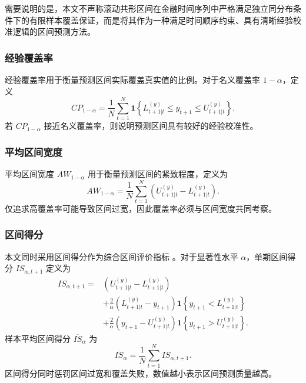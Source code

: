需要说明的是，本文不声称滚动共形区间在金融时间序列中严格满足独立同分布条件下的有限样本覆盖保证，而是将其作为一种满足时间顺序约束、具有清晰经验校准逻辑的区间预测方法。

\subsubsection{经验覆盖率}

经验覆盖率用于衡量预测区间实际覆盖真实值的比例。对于名义覆盖率 \(1-\alpha\)，定义
\begin{equation}
	CP_{1-\alpha}
	=
	\frac{1}{N}
	\sum_{t=1}^{N}
	\mathbf{1}
	\left\{
	L^{(y)}_{t+1|t}
	\leq
	y_{t+1}
	\leq
	U^{(y)}_{t+1|t}
	\right\}.
\end{equation}
若 \(CP_{1-\alpha}\) 接近名义覆盖率，则说明预测区间具有较好的经验校准性。

\subsubsection{平均区间宽度}

平均区间宽度 $AW_{1-\alpha}$ 用于衡量预测区间的紧致程度，定义为
\begin{equation}
	AW_{1-\alpha}
	=
	\frac{1}{N}
	\sum_{t=1}^{N}
	\left(
	U^{(y)}_{t+1|t}
	-
	L^{(y)}_{t+1|t}
	\right).
\end{equation}
仅追求高覆盖率可能导致区间过宽，因此覆盖率必须与区间宽度共同考察。

\subsubsection{区间得分}

本文同时采用区间得分作为综合区间评价指标 \citep{GneitingRaftery2007}。对于显著性水平 \(\alpha\)，单期区间得分 $IS_{\alpha,t+1}$ 定义为
\begin{equation}
	\begin{aligned}
		IS_{\alpha,t+1}
		=
		&
		\left(
		U^{(y)}_{t+1|t}
		-
		L^{(y)}_{t+1|t}
		\right)
		\\
		&
		+
		\frac{2}{\alpha}
		\left(
		L^{(y)}_{t+1|t}
		-
		y_{t+1}
		\right)
		\mathbf{1}
		\left\{
		y_{t+1}<L^{(y)}_{t+1|t}
		\right\}
		\\
		&
		+
		\frac{2}{\alpha}
		\left(
		y_{t+1}
		-
		U^{(y)}_{t+1|t}
		\right)
		\mathbf{1}
		\left\{
		y_{t+1}>U^{(y)}_{t+1|t}
		\right\}.
	\end{aligned}
\end{equation}
样本平均区间得分 $\overline{IS}_{\alpha}$ 为
\begin{equation}
	\overline{IS}_{\alpha}
	=
	\frac{1}{N}
	\sum_{t=1}^{N}
	IS_{\alpha,t+1}.
\end{equation}
区间得分同时惩罚区间过宽和覆盖失败，数值越小表示区间预测质量越高。

